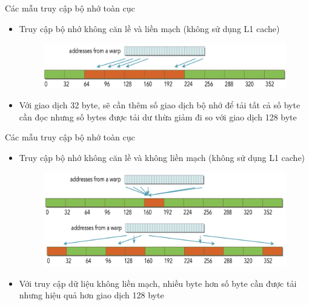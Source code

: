 \documentclass[10pt]{beamer}
\theoremstyle{remark}
\numberwithin{algocf}{section}
\numberwithin{equation}{section}
\numberwithin{dl}{section}
\numberwithin{figure}{section}
\begin{document}
\begin{frame}{Các mẫu truy cập bộ nhớ toàn cục}
    \begin{itemize}
        \item Truy cập bộ nhớ không căn lề và liền mạch (không sử dụng L1 cache)
        \begin{figure}[H]
            \centering
            \includegraphics[width=0.7\linewidth]{figures/CUDA/Misaligned_Coalesced_Global_Memory_Transaction_2.png}
        \end{figure}
        \item Với giao dịch 32 byte, sẽ cần thêm số giao dịch bộ nhớ để tải tất cả số byte cần đọc nhưng số bytes được tải dư thừa giảm đi so với giao dịch 128 byte
    \end{itemize}
\end{frame}

\begin{frame}{Các mẫu truy cập bộ nhớ toàn cục}
    \begin{itemize}
        \item Truy cập bộ nhớ không căn lề và không liền mạch (không sử dụng L1 cache)
        \begin{figure}[H]
            \centering
            \includegraphics[width=0.7\linewidth]{figures/CUDA/Misaligned_Uncoalesced_Global_Memory_Transaction_3.png}
        \end{figure}
        \item Với truy cập dữ liệu không liền mạch, nhiều byte hơn số byte cần được tải nhưng hiệu quả hơn giao dịch 128 byte
    \end{itemize}
\end{frame}
\end{document}
